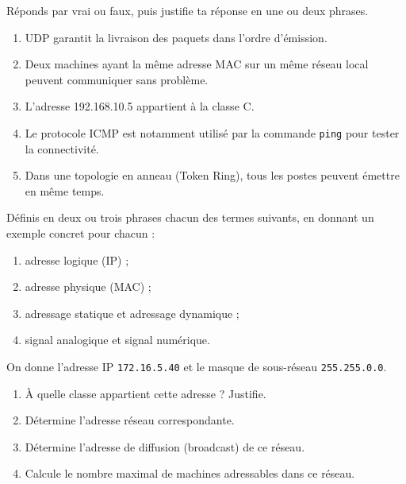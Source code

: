 \documentclass[11pt]{article}
\newcounter{popsec}
\newcounter{popsub}
\newcommand{\courssub}[1]{%
  \stepcounter{popsub}%
  \par\vspace{9pt}\noindent{\popxbold\fontsize{11.5}{13}\selectfont\color{popink}{\color{poporange}\thepopsec.\thepopsub}\hspace{6pt}#1}\par\nopagebreak\vspace{4pt}
}
\begin{document}
\begin{exercice}
Réponds par vrai ou faux, puis justifie ta réponse en une ou deux phrases.
\begin{enumerate}
\item UDP garantit la livraison des paquets dans l'ordre d'émission.
\item Deux machines ayant la même adresse MAC sur un même réseau local peuvent communiquer sans problème.
\item L'adresse 192.168.10.5 appartient à la classe C.
\item Le protocole ICMP est notamment utilisé par la commande \texttt{ping} pour tester la connectivité.
\item Dans une topologie en anneau (Token Ring), tous les postes peuvent émettre en même temps.
\end{enumerate}
\end{exercice}

\begin{exercice}[Définitions]
Définis en deux ou trois phrases chacun des termes suivants, en donnant un exemple concret pour chacun :
\begin{enumerate}
\item adresse logique (IP) ;
\item adresse physique (MAC) ;
\item adressage statique et adressage dynamique ;
\item signal analogique et signal numérique.
\end{enumerate}
\end{exercice}

\begin{exercice}
On donne l'adresse IP \texttt{172.16.5.40} et le masque de sous-réseau \texttt{255.255.0.0}.
\begin{enumerate}
\item À quelle classe appartient cette adresse ? Justifie.
\item Détermine l'adresse réseau correspondante.
\item Détermine l'adresse de diffusion (broadcast) de ce réseau.
\item Calcule le nombre maximal de machines adressables dans ce réseau.
\end{enumerate}
\end{exercice}

\courssub{Je m'entraîne}
\end{document}
